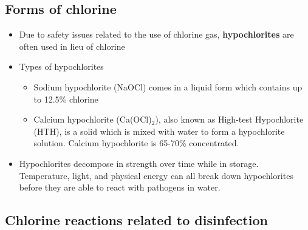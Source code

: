 \subsection{Forms of chlorine}

\begin{itemize}
	\item Due to safety issues related to the use of chlorine gas, \textbf{hypochlorites} are often used in lieu of chlorine
	\item Types of hypochlorites
	\begin{itemize}
	\item Sodium hypochlorite (NaOCl) comes in a liquid form which contains up to 12.5\% chlorine
	\item Calcium hypochlorite (Ca(OCl)$_2$), also known as High-test Hypochlorite (HTH), is a solid which is mixed with water to form a hypochlorite solution. Calcium hypochlorite is 65-70\% concentrated.
	\end{itemize}
	\item Hypochlorites decompose in strength over time while in storage. Temperature, light, and physical energy can all break down hypochlorites before they are able to react with pathogens in water. 

\end{itemize} 

\subsection{Chlorine reactions related to disinfection}


